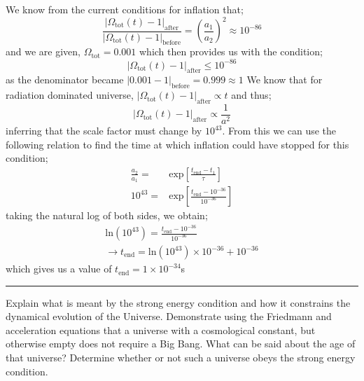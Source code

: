 \documentclass[11pt, a4paper, answers]{exam}
\begin{document}
\begin{questions}
    \begin{solution}
        We know from the current conditions for inflation that;
        \begin{equation*}
            \frac{|\Omega_{\text{tot}}(t)-1|_{\text{after}}}{|\Omega_{\text{tot}}(t)-1|_{\text{before}}} = \left(
            \frac{a_1}{a_2}
            \right)^2 \approx 10^{-86}
        \end{equation*}
        and we are given, $\Omega_{\text{tot}} = 0.001 $ which then provides us with the condition;
        \begin{equation*}
            |\Omega_{\text{tot}}(t)-1|_{\text{after}} \le 10^{-86}
        \end{equation*}
        as the denominator became $|0.001 - 1|_{\text{before}} = 0.999\approx 1$
        We know that for radiation dominated universe, $|\Omega_{\text{tot}}(t)-1|_{\text{after}}
            \propto t$ and thus;
        \begin{equation*}
            |\Omega_{\text{tot}}(t)-1|_{\text{after}} \propto \frac{1}{a^2}
        \end{equation*}
        inferring that the scale factor must change by $10^{43}$. From this we can use the following
        relation to find the time at which inflation could have stopped for this condition;
        \begin{align*}
            \frac{a_2}{a_1} = & \text{exp}\left[
                \frac{t_{\text{end}}-t_1}{\tau}
            \right]                              \\
            10^{43} =         & \text{exp}\left[
            \frac{t_{\text{end}}-10^{-36}}{10^{-36}}
            \right]
        \end{align*}
        taking the natural log of both sides, we obtain;
        \begin{align*}
            \text{ln}(10^{43}) = \frac{t_{\text{end}}-10^{-36}}{10^{-36}} \\
            \to t_{\text{end}} = \text{ln}(10^{43}) \times 10^{-36} + 10^{-36}
        \end{align*}
        which gives us a value of $t_{\text{end}} = 1\times10^{-34}$s
    \end{solution}

    \begin{center}
        \rule{8cm}{0.4pt}
    \end{center}
    \newpage


    \question Explain what is meant by the strong energy condition and how it constrains the dynamical
    evolution of the Universe. Demonstrate using the Friedmann and acceleration equations that a
    universe with a cosmological constant, but otherwise empty does not require a Big Bang. What
    can be said about the age of that universe? Determine whether or not such a universe obeys
    the strong energy condition.


\end{questions}
\end{document}
